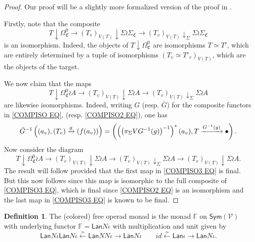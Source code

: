 \documentclass[a4paper,10pt
,draft
]{article}%
\numberwithin{equation}{section}
\numberwithin{figure}{section}
\theoremstyle{definition} %
\newtheorem{definition}[equation]{Definition}%
\newcommand{\1}{\ensuremath{\mathbbm 1}}%
\begin{document}
\begin{proof}
Our proof will be a slightly more formalized version of the proof in \cite[Lemma 4.28]{BP_geo}.

Firstly, note that the composite
\begin{equation}\label{COMPISO EQ}
T \downarrow \Omega^0_{\mathfrak{C}} 
	\to 
\left( T_v \right)_{V(T)} \downarrow \Sigma \wr \Sigma_{\mathfrak{C}}
	\to
\left( T_v \right)_{V(T)} \downarrow_{\Sigma} \Sigma \wr \Sigma_{\mathfrak{C}}
\end{equation}
is an isomorphism. Indeed, the objects of 
$T \downarrow \Omega^0_{\mathfrak{C}}$
are isomorphisms $T \simeq T'$, which are entirely determined by 
a tuple of isomorphisms $\left(T_v \simeq T'_v\right)_{V(T)}$,
which are the objects of the target. 

We now claim that the maps
\begin{equation}\label{COMPISO2 EQ}
T \downarrow \Omega^0_{\mathfrak{C}} \wr A
	\to 
\left( T_v \right)_{V(T)} \downarrow \Sigma \wr A
	\to
\left( T_v \right)_{V(T)} \downarrow_{\Sigma} \Sigma \wr A
\end{equation}
are likewise isomorphisms.
Indeed, writing $G$ (resp. $\bar{G}$) for the composite functors in \eqref{COMPISO EQ}, (resp. \eqref{COMPISO2 EQ}), one has
\[
\bar{G}^{-1}
\left((a_v), (T_v) \xrightarrow{g} (f(a_v))\right)=
\left(\left(\left(\pi_{\Sigma} V G^{-1}(g)\right)^{-1}\right)^{\**} (a_v),
T \xrightarrow{G^{-1}(g)} \bullet
\right).
\]
Now consider the diagram
\begin{equation}\label{COMPISO3 EQ}
T \downarrow \Omega^0_{\mathfrak{C}} \wr A
	\to 
\left( T_v \right)_{V(T)} \downarrow \Sigma \wr A
	\to
\left( T_v \right)_{V(T)} \downarrow_{\Sigma} \Sigma \wr A
	\to 
\left( T_v \right)_{V(T)} \downarrow \Sigma \wr A.
\end{equation}
The result will follow provided that the first map in \eqref{COMPISO3 EQ} is final. But this now follows since this map is isomorphic to the full composite of \eqref{COMPISO3 EQ}, which is final since \eqref{COMPISO2 EQ} is an isomorphism and the last map in \eqref{COMPISO3 EQ} is known to be final.
\end{proof}



\begin{definition}\label{COLORMON DEF}
The (colored) free operad monad is the monad
$\mathbb{F}$ on $\mathsf{Sym}(\mathcal{V})$
with underlying functor
$\mathbb{F} = \mathsf{Lan} N \iota$ with multiplication and unit given by
\[
	\mathsf{Lan} N \iota \mathsf{Lan} N \iota \xleftarrow{\simeq} 
	\mathsf{Lan} N N \iota \to 
	\mathsf{Lan} N \iota
\qquad
	id \xleftarrow{\simeq} 
	\mathsf{Lan} \iota \to
	\mathsf{Lan} N \iota.
\]
\end{definition}
\end{document}
